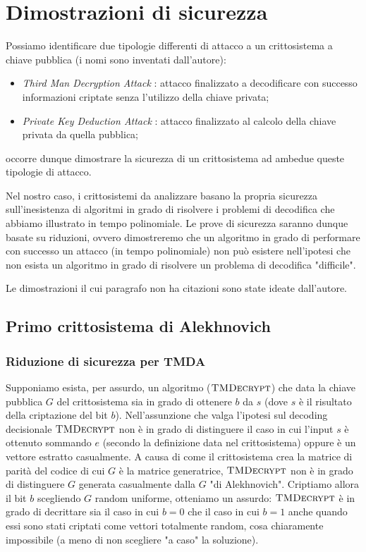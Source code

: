 \documentclass[12pt, a4paper]{report}
\theoremstyle{definition}
\begin{document}
		\section{Dimostrazioni di sicurezza}
			Possiamo identificare due tipologie differenti di attacco a un crittosistema a chiave pubblica (i nomi sono inventati dall'autore):
			\begin{itemize}
				\item \emph{Third Man Decryption Attack} : attacco finalizzato a decodificare con successo informazioni criptate senza l'utilizzo della chiave privata;
				\item \emph{Private Key Deduction Attack} : attacco finalizzato al calcolo della chiave privata da quella pubblica;
			\end{itemize}
			occorre dunque dimostrare la sicurezza di un crittosistema ad ambedue queste tipologie di attacco.
			
			Nel nostro caso, i crittosistemi da analizzare basano la propria sicurezza sull'inesistenza di algoritmi in grado di risolvere i problemi di decodifica che abbiamo illustrato in tempo polinomiale. Le prove di sicurezza saranno dunque basate su riduzioni, ovvero dimostreremo che un algoritmo in grado di performare con successo un attacco (in tempo polinomiale) non può esistere nell'ipotesi che non esista un algoritmo in grado di risolvere un problema di decodifica "difficile".
			
			Le dimostrazioni il cui paragrafo non ha citazioni sono state ideate dall'autore.
			\subsection{Primo crittosistema di Alekhnovich}
				\subsubsection{Riduzione di sicurezza per TMDA \cite{9}}
				Supponiamo esista, per assurdo, un algoritmo ($\textsc{TMDecrypt}$) che data la chiave pubblica $G$ del crittosistema sia in grado di ottenere $b$ da $s$ (dove $s$ è il risultato della criptazione del bit $b$). Nell'assunzione che valga l'ipotesi sul decoding decisionale $\textsc{TMDecrypt}$ non è in grado di distinguere il caso in cui l'input $s$ è ottenuto sommando $e$ (secondo la definizione data nel crittosistema) oppure è un vettore estratto casualmente. A causa di come il crittosistema crea la matrice di parità del codice di cui $G$ è la matrice generatrice, $\textsc{TMDecrypt}$ non è in grado di distinguere $G$ generata casualmente dalla $G$ "di Alekhnovich". Criptiamo allora il bit $b$ scegliendo $G$ random uniforme, otteniamo un assurdo: $\textsc{TMDecrypt}$ è in grado di decrittare sia il caso in cui $b=0$ che il caso in cui $b=1$ anche quando essi sono stati criptati come vettori totalmente random, cosa chiaramente impossibile (a meno di non scegliere "a caso" la soluzione). 
\end{document}

